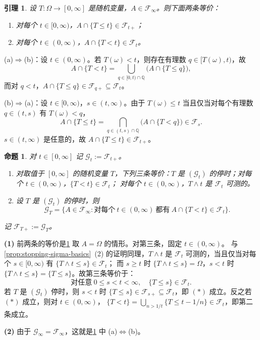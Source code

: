 \documentclass[UTF8,11pt,a4paper,oneside,fontset=fandol]{ctexrep}
\makeatletter
\numberwithin{equation}{section}
\theoremstyle{zhthm}
\newtheorem{proposition}[theorem]{命题}
\newtheorem{lemma}[theorem]{引理}
\renewenvironment{proof}[1][\proofname]{\par
  \pushQED{\qed}%
  \normalfont\topsep6\p@\@plus6\p@\relax
  \trivlist
  \item[\hskip\labelsep\bfseries#1\hspace{0.5em}]\ignorespaces
}{%
  \popQED\endtrivlist\@endpefalse
}
\renewcommand{\proofname}{证明}
\newcommand{\Q}{\mathbb{Q}}
\newcommand{\F}{\mathcal{F}}
\newcommand{\G}{\mathcal{G}}
\makeatother
\begin{document}
\begin{lemma}
\label{lem:right-continuous-stopping-criterion}
设 $T:\Omega\to[0,\infty]$ 是随机变量，$A\in\F_\infty$。则下面两条等价：
\begin{enumerate}[label=(\alph*)]
  \item 对每个 $t\in[0,\infty)$，$A\cap\{T\le t\}\in\F_{t+}$；
  \item 对每个 $t\in(0,\infty)$，$A\cap\{T<t\}\in\F_t$。
\end{enumerate}
\end{lemma}

\begin{proof}
(a)$\Rightarrow$(b)：设 $t\in(0,\infty)$。若 $T(\omega)<t$，则存在有理数 $q\in[T(\omega),t)$，故
\[
  A\cap\{T<t\}=\bigcup_{q\in[0,t)\cap\Q}\bigl(A\cap\{T\le q\}\bigr),
\]
而对 $q<t$，$A\cap\{T\le q\}\in\F_{q+}\subseteq\F_t$。

(b)$\Rightarrow$(a)：设 $t\in[0,\infty)$，$s\in(t,\infty)$。由于 $T(\omega)\le t$ 当且仅当对每个有理数 $q\in(t,s)$ 有 $T(\omega)<q$，
\[
  A\cap\{T\le t\}=\bigcap_{q\in(t,s)\cap\Q}\bigl(A\cap\{T<q\}\bigr)\in\F_s.
\]
$s\in(t,\infty)$ 是任意的，故 $A\cap\{T\le t\}\in\F_{t+}$。
\end{proof}

\begin{proposition}
\label{prop:right-continuous-stopping-times}
对 $t\in[0,\infty]$ 记 $\G_t:=\F_{t+}$。
\begin{enumerate}[label=(\arabic*)]
  \item 对取值于 $[0,\infty]$ 的随机变量 $T$，下列三条等价：$T$ 是 $(\G_t)$ 的停时；对每个 $t\in(0,\infty)$，$\{T<t\}\in\F_t$；
    对每个 $t\in(0,\infty)$，$T\wedge t$ 是 $\F_t$ 可测的。
  \item 设 $T$ 是 $(\G_t)$ 的停时，则
    \[
      \G_T=\bigl\{A\in\F_\infty:\text{对每个}\ t\in(0,\infty)\ \text{都有}\ A\cap\{T<t\}\in\F_t\bigr\}.
    \]
\end{enumerate}
记 $\F_{T+}:=\G_T$。
\end{proposition}

\begin{proof}
\textbf{(1)} 前两条的等价是\cref{lem:right-continuous-stopping-criterion} 取 $A=\Omega$ 的情形。对第三条，固定 $t\in(0,\infty)$。
与\cref{prop:stopping-sigma-basics}~(2) 的证明同理，$T\wedge t$ 是 $\F_t$ 可测的，当且仅当对每个 $s\in[0,\infty)$ 有 $\{T\wedge t\le s\}\in\F_t$；
而 $s\ge t$ 时 $\{T\wedge t\le s\}=\Omega$，$s<t$ 时 $\{T\wedge t\le s\}=\{T\le s\}$。故第三条等价于：
\[
  \text{对任意}\ 0\le s<t<\infty,\quad \{T\le s\}\in\F_t. \tag{$\ast$}
\]
若 $T$ 是 $(\G_t)$ 停时，则 $s<t$ 时 $\{T\le s\}\in\F_{s+}\subseteq\F_t$，即 $(\ast)$ 成立。反之若 $(\ast)$ 成立，则对 $t\in(0,\infty)$，
$\{T<t\}=\bigcup_{n>1/t}\{T\le t-1/n\}\in\F_t$，即第二条成立。

\textbf{(2)} 由于 $\G_\infty=\F_\infty$，这就是\cref{lem:right-continuous-stopping-criterion} 中 (a)$\Leftrightarrow$(b)。
\end{proof}
\end{document}
